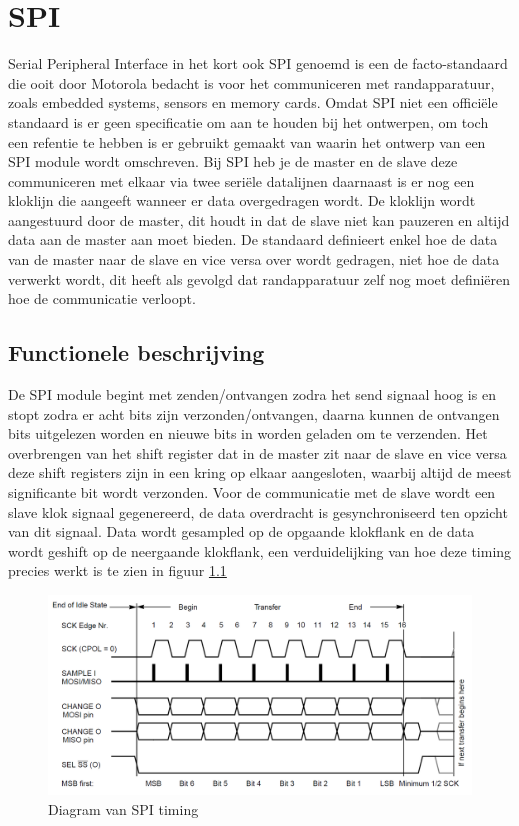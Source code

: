 \documentclass[oneside,dutch]{tudelft-report}
\begin{document}
\chapter{SPI}
Serial Peripheral Interface in het kort ook SPI genoemd is een de facto-standaard die ooit door Motorola bedacht is voor het communiceren met randapparatuur, zoals embedded systems, sensors en memory cards. Omdat SPI niet een officiële standaard is er geen specificatie om aan te houden bij het ontwerpen, om toch een refentie te hebben is er gebruikt gemaakt van \cite{motorola} waarin het ontwerp van een SPI module wordt omschreven. Bij SPI heb je de master en de slave deze communiceren met elkaar via twee seriële datalijnen daarnaast is er nog een kloklijn die aangeeft wanneer er data overgedragen wordt. De kloklijn wordt aangestuurd door de master, dit houdt in dat de slave niet kan pauzeren en altijd data aan de master aan moet bieden. De standaard definieert enkel hoe de data van de master naar de slave en vice versa over wordt gedragen, niet hoe de data verwerkt wordt, dit heeft als gevolgd dat randapparatuur zelf nog moet definiëren hoe de communicatie verloopt.

\section{Functionele beschrijving}
De SPI module begint met zenden/ontvangen zodra het send signaal hoog is en stopt zodra er acht bits zijn verzonden/ontvangen, daarna kunnen de ontvangen bits uitgelezen worden en nieuwe bits in worden geladen om te verzenden. Het overbrengen van het shift register dat in de master zit naar de slave en vice versa deze shift registers zijn in een kring op elkaar aangesloten, waarbij altijd de meest significante bit wordt verzonden. Voor de communicatie met de slave wordt een slave klok signaal gegenereerd, de data overdracht is gesynchroniseerd ten opzicht van dit signaal. Data wordt gesampled op de opgaande klokflank en de data wordt geshift op de neergaande klokflank, een verduidelijking van hoe deze timing precies werkt is te zien in figuur \ref{spi-timing-diagram}

\begin{figure}[H]
\center
\includegraphics[width=15cm]{./spi_timing_diagram}
\caption{Diagram van SPI timing}
\label{spi-timing-diagram}
\end{figure}
\end{document}
